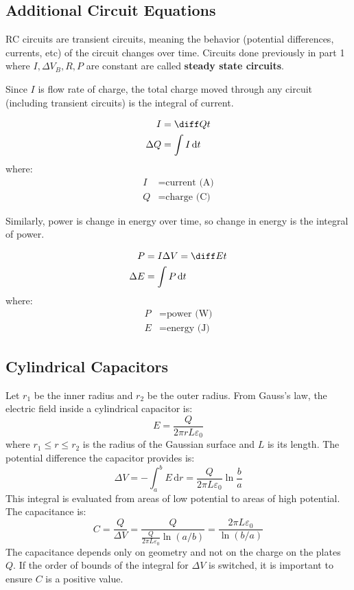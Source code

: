 \documentclass{article}
\newcommand{\theorem}[2]{\begin{tcolorbox}[title={#1},colback=blue!5!white,colframe=blue!75!black,parbox=false] #2 \end{tcolorbox}}
\begin{document}
\subsection{Additional Circuit Equations}

RC circuits are transient circuits, meaning the behavior (potential differences, currents, etc) of the circuit changes over time. Circuits done previously in part 1 where $I,\Delta V_B,R,P$ are constant are called \textbf{steady state circuits}.

Since $I$ is flow rate of charge, the total charge moved through any circuit (including transient circuits) is the integral of current.
\theorem{Current and charge}{
	\begin{align*}
		I&=\diff Qt \\
		\Delta Q&=\int I\,\mathrm{d}t
	\end{align*}
	where:
	\begin{align*}
		I&=\text{current (A)} \\
		Q&=\text{charge (C)}
	\end{align*}
}
Similarly, power is change in energy over time, so change in energy is the integral of power.
\theorem{Power and energy}{
	\begin{align*}
		P&=I\Delta V=\diff Et \\
		\Delta E&=\int P\,\mathrm{d}t
	\end{align*}
	where:
	\begin{align*}
		P&=\text{power (W)} \\
		E&=\text{energy (J)}
	\end{align*}
}

\subsection{Cylindrical Capacitors}

Let $r_1$ be the inner radius and $r_2$ be the outer radius. From Gauss's law, the electric field inside a cylindrical capacitor is:
\begin{equation*}
    E=\frac{Q}{2\pi rL \varepsilon_0}
\end{equation*}
where $r_1\leq r\leq r_2$ is the radius of the Gaussian surface and $L$ is its length. The potential difference the capacitor provides is:
\begin{equation*}
    \Delta V
	=-\int_{a}^{b}E\,\mathrm{d}r
	=\frac{Q}{2\pi L\varepsilon_0}\ln \frac{b}{a}
\end{equation*}
This integral is evaluated from areas of low potential to areas of high potential. The capacitance is:
\begin{equation*}
    C
	=\frac{Q}{\Delta V}
	=\frac{Q}{\frac{Q}{2\pi L\varepsilon_0}\ln(a/b)}
	=\frac{2\pi L\varepsilon_0}{\ln(b/a)}
\end{equation*}
The capacitance depends only on geometry and not on the charge on the plates $Q$. If the order of bounds of the integral for $\Delta V$ is switched, it is important to ensure $C$ is a positive value.
\end{document}
